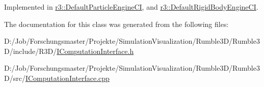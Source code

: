 Implemented in \mbox{\hyperlink{classr3_1_1_default_particle_engine_c_i_a7c58fd00ec521410e1b412e9885ee0d2}{r3\+::\+Default\+Particle\+Engine\+CI}}, and \mbox{\hyperlink{classr3_1_1_default_rigid_body_engine_c_i_ac45ae1d1889c75e6839b865870cbf59c}{r3\+::\+Default\+Rigid\+Body\+Engine\+CI}}.



The documentation for this class was generated from the following files\+:\begin{DoxyCompactItemize}
\item 
D\+:/\+Job/\+Forschungsmaster/\+Projekte/\+Simulation\+Visualization/\+Rumble3\+D/\+Rumble3\+D/include/\+R3\+D/\mbox{\hyperlink{_i_computation_interface_8h}{I\+Computation\+Interface.\+h}}\item 
D\+:/\+Job/\+Forschungsmaster/\+Projekte/\+Simulation\+Visualization/\+Rumble3\+D/\+Rumble3\+D/src/\mbox{\hyperlink{_i_computation_interface_8cpp}{I\+Computation\+Interface.\+cpp}}\end{DoxyCompactItemize}
